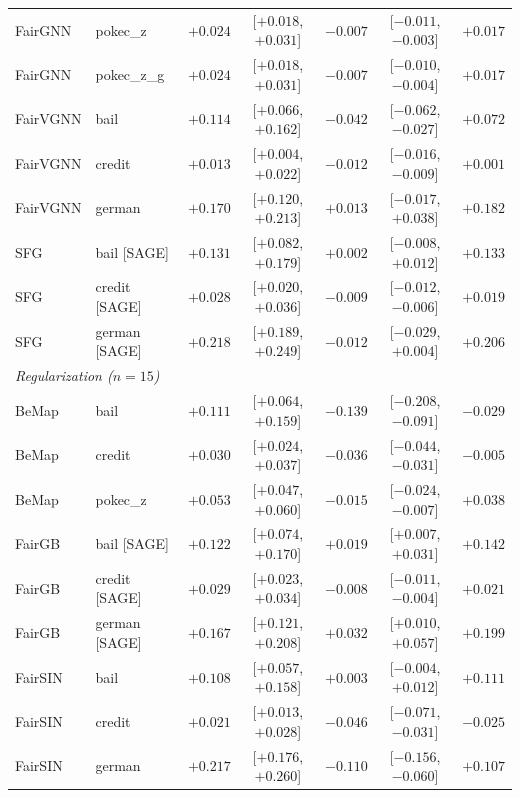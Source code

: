 \begin{table}[t]
\begin{tabular}{llrcrcr}
FairGNN & pokec\_z & $+0.024$ & [$+0.018$, $+0.031$] & $-0.007$ & [$-0.011$, $-0.003$] & $+0.017$ \\
FairGNN & pokec\_z\_g & $+0.024$ & [$+0.018$, $+0.031$] & $-0.007$ & [$-0.010$, $-0.004$] & $+0.017$ \\
\midrule
FairVGNN & bail & $+0.114$ & [$+0.066$, $+0.162$] & $\mathbf{-0.042}$ & [$-0.062$, $-0.027$] & $+0.072$ \\
FairVGNN & credit & $+0.013$ & [$+0.004$, $+0.022$] & $\mathbf{-0.012}$ & [$-0.016$, $-0.009$] & $+0.001$ \\
FairVGNN & german & $+0.170$ & [$+0.120$, $+0.213$] & $+0.013$ & [$-0.017$, $+0.038$] & $+0.182$ \\
\midrule
SFG & bail [SAGE] & $+0.131$ & [$+0.082$, $+0.179$] & $+0.002$ & [$-0.008$, $+0.012$] & $+0.133$ \\
SFG & credit [SAGE] & $+0.028$ & [$+0.020$, $+0.036$] & $-0.009$ & [$-0.012$, $-0.006$] & $+0.019$ \\
SFG & german [SAGE] & $+0.218$ & [$+0.189$, $+0.249$] & $-0.012$ & [$-0.029$, $+0.004$] & $+0.206$ \\
\midrule
\multicolumn{7}{l}{\textit{Regularization ($n=15$)}} \\
BeMap & bail & $+0.111$ & [$+0.064$, $+0.159$] & $\mathbf{-0.139}$ & [$-0.208$, $-0.091$] & $-0.029$ \\
BeMap & credit & $+0.030$ & [$+0.024$, $+0.037$] & $\mathbf{-0.036}$ & [$-0.044$, $-0.031$] & $-0.005$ \\
BeMap & pokec\_z & $+0.053$ & [$+0.047$, $+0.060$] & $\mathbf{-0.015}$ & [$-0.024$, $-0.007$] & $+0.038$ \\
\midrule
FairGB & bail [SAGE] & $+0.122$ & [$+0.074$, $+0.170$] & $\mathbf{+0.019}$ & [$+0.007$, $+0.031$] & $+0.142$ \\
FairGB & credit [SAGE] & $+0.029$ & [$+0.023$, $+0.034$] & $-0.008$ & [$-0.011$, $-0.004$] & $+0.021$ \\
FairGB & german [SAGE] & $+0.167$ & [$+0.121$, $+0.208$] & $\mathbf{+0.032}$ & [$+0.010$, $+0.057$] & $+0.199$ \\
\midrule
FairSIN & bail & $+0.108$ & [$+0.057$, $+0.158$] & $+0.003$ & [$-0.004$, $+0.012$] & $+0.111$ \\
FairSIN & credit & $+0.021$ & [$+0.013$, $+0.028$] & $\mathbf{-0.046}$ & [$-0.071$, $-0.031$] & $-0.025$ \\
FairSIN & german & $+0.217$ & [$+0.176$, $+0.260$] & $\mathbf{-0.110}$ & [$-0.156$, $-0.060$] & $+0.107$ \\

\end{tabular}
\end{table}

